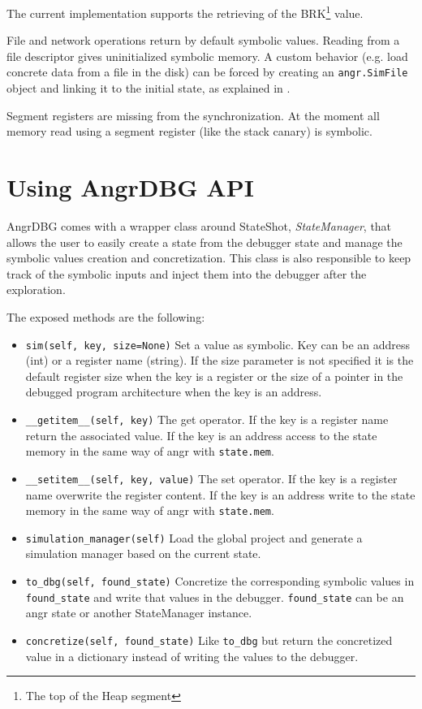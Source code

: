 
The current implementation supports the retrieving of the BRK\footnote{The top of the Heap segment} value.

File and network operations return by default symbolic values. Reading from a file descriptor gives uninitialized symbolic memory. A custom behavior (e.g. load concrete data from a file in the disk) can be forced by creating an \verb|angr.SimFile| object and linking it to the initial state, as explained in \cite{angr_file_doc}.

Segment registers are missing from the synchronization. At the moment all memory read using a segment register (like the stack canary) is symbolic.

\section{Using AngrDBG API}

AngrDBG comes with a wrapper class around StateShot, {\em StateManager}, that allows the user to easily create a state from the debugger state and manage the symbolic values creation and concretization. This class is also responsible to keep track of the symbolic inputs and inject them into the debugger after the exploration.

The exposed methods are the following:

\begin{itemize}
\item \verb|sim(self, key, size=None)| Set a value as symbolic. Key can be an address (int) or a register name (string). If the size parameter is not specified it is the default register size when the key is a register or the size of a pointer in the debugged program architecture when the key is an address.
\item \verb|__getitem__(self, key)| The get operator. If the key is a register name return the associated value. If the key is an address access to the state memory in the same way of angr with \verb|state.mem|.
\item \verb|__setitem__(self, key, value)| The set operator. If the key is a register name overwrite the register content. If the key is an address write to the state memory in the same way of angr with \verb|state.mem|.
\item \verb|simulation_manager(self)| Load the global project and generate a simulation manager based on the current state.
\item \verb|to_dbg(self, found_state)| Concretize the corresponding symbolic values in \verb|found_state| and write that values in the debugger. \verb|found_state| can be an angr state or another StateManager instance.
\item \verb|concretize(self, found_state)| Like \verb|to_dbg| but return the concretized value in a dictionary instead of writing the values to the debugger.
\end{itemize}

